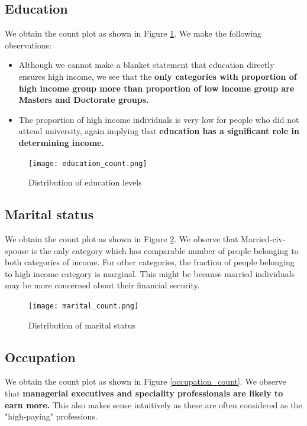 \documentclass[conference]{IEEEtran}
\begin{document}
\subsection*{Education}

We obtain the count plot as shown in Figure \ref{education_count}. We make the following observations:

\begin{itemize}
    \item Although we cannot make a blanket statement that education directly ensures high income, we see that the \textbf{only categories with proportion of high income group more than proportion of low income group are Masters and Doctorate groups.} 
    \item The proportion of high income individuals is very low for people who did not attend university, again implying that \textbf{education has a significant role in determining income.}
\end{itemize}


\begin{figure}[tbh]
\centering
\texttt{[image: education\_count.png]}
\caption{Distribution of education levels }
\label{education_count}
\end{figure}

\subsection*{Marital status}

We obtain the count plot as shown in Figure \ref{marital_count}. We observe that Married-civ-spouse is the only category which has comparable number of people belonging to both categories of income. For other categories, the fraction of people belonging to high income category is marginal. This might be because married individuals may be more concerned about their financial security.


\begin{figure}[tbh]
\centering
\texttt{[image: marital\_count.png]}
\caption{Distribution of marital status }
\label{marital_count}
\end{figure}

\subsection*{Occupation}

We obtain the count plot as shown in Figure \ref{occupation_count}. We observe that \textbf{managerial executives and speciality professionals are likely to earn more.} This also makes sense intuitively as these are often considered as the "high-paying" professions.
\end{document}
